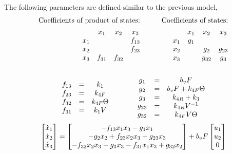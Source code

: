 The following parameters are defined similar to the previous model,
\begin{align*}
    \text{Coefficients of product of states:} &\qquad& \text{Coefficients of states:}\\
    \begin{matrix}    & x_1    & x_2      & x_3    \\
        x_1 &        &          & f_{13} \\
        x_2 &        &          & f_{23} \\
        x_3 & f_{31} & f_{32}   & \end{matrix}
    &\qquad &
    \begin{matrix}     & x_1    & x_2      & x_3    \\
        x_1  & g_1    &          &        \\
        x_2  &        & g_{2}    & g_{23} \\
        x_3  &        & g_{32}   & g_{3} \end{matrix}
\end{align*}
\begin{align*}
    \begin{matrix} 
    \\f_{13} &=& k_1
    \\f_{23} &=& k_{4F}
    \\f_{32} &=& k_{4F} \Theta
    \\f_{31} &=& k_1 V
     \end{matrix}
    \qquad \qquad
    \begin{matrix} 
    \\ g_1    &=& b_v F
    \\ g_2    &=& b_v F + k_{4F} \Theta
    \\ g_{3}  &=& k_{4R}+k_3
    \\ g_{23} &=& k_{4R} V^{-1}
    \\ g_{32} &=& k_{4F} V \Theta
     \end{matrix}
\end{align*}
\begin{equation}\label{eqn::parm_model_M}
     \begin{bmatrix} \dot x_1 \\
        \dot x_2\\
        \dot x_3\\
         \end{bmatrix} =
    \begin{bmatrix} 
        -f_{13} x_1 x_3
        -g_1 x_1
        \\
        -g_2 x_2
        + f_{23} x_2 x_3
        + g_{23} x_3
        \\
        -f_{32} x_2 x_3
        -g_3 x_3
        -f_{31} x_1 x_3
        + g_{32} x_2
     \end{bmatrix}
    + b_v F \begin{bmatrix} u_1 \\ u_2 \\ 0 \end{bmatrix}
\end{equation}


